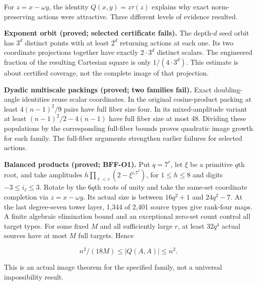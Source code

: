 \documentclass[12pt,a4paper]{article}
\newcommand{\headone}[1]{\vspace{6pt}{\raggedright\hyphenpenalty=10000\fontsize{22}{25}\selectfont\bfseries #1\par}\vspace{3pt}}
\begin{document}
\label{sec:norm-orbits-and-the-retirement-tests}\headone{Norm orbits and the retirement tests}

For $z=x-\omega y$, the identity $Q(x,y)=z\tau(z)$ explains why exact norm-preserving actions were attractive. Three different levels of evidence resulted.\par

\textbf{Exponent orbit (proved; selected certificate fails).} The depth-$d$ seed orbit has $3^d$ distinct points with at least $2^d$ returning actions at each one. Its two coordinate projections together have exactly $2\cdot3^d$ distinct scalars. The engineered fraction of the resulting Cartesian square is only $1/(4\cdot3^d)$. This estimate is about certified coverage, not the complete image of that projection.\par

\textbf{Dyadic multiscale packings (proved; two families fail).} Exact doubling-angle identities reuse scalar coordinates. In the original cosine-product packing at least $4(n-1)^2/9$ pairs have full fiber size four. In its mixed-amplitude variant at least $(n-1)^2/2-4(n-1)$ have full fiber size at most 48. Dividing these populations by the corresponding full-fiber bounds proves quadratic image growth for each family. The full-fiber arguments strengthen earlier failures for selected actions.\par

\textbf{Balanced products (proved; BFF-O1).} Put $q=7^r$, let $\xi$ be a primitive $q$th root, and take amplitudes $h\prod_{\ell<r}(2-\xi^{i_\ell 7^\ell})$, for $1\le h\le8$ and digits $-3\le i_\ell\le3$. Rotate by the $6q$th roots of unity and take the same-set coordinate completion via $z=x-\omega y$. Its actual size is between $16q^2+1$ and $24q^2-7$. At the last degree-seven tower layer, 1,344 of 2,401 source types give rank-four maps. A finite algebraic elimination bound and an exceptional zero-set count control all target types. For some fixed $M$ and all sufficiently large $r$, at least $32q^4$ actual sources have at most $M$ full targets. Hence\par

\begin{equation*}\tag*{}\label{eq:norm-orbits-and-the-retirement-tests-1}
n^2/(18M)\le |Q(A,A)|\le n^2 .
\end{equation*}

This is an actual image theorem for the specified family, not a universal impossibility result.\par
\end{document}
